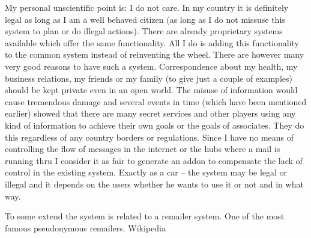 My personal unscientific point is: I do not care. In my country it is definitely legal as long as I am a well behaved citizen (as long as I do not missuse this system to plan or do illegal actions). There are already proprietary systems available which offer the same functionality. All I do is adding this functionality to the common system instead of reinventing the wheel. There are however many very good reasons to have such a system. Correspondence about my health, my business relations, my friends or my family (to give just a couple of examples) should be kept private even in an open world. The misuse of information would cause tremendous damage and several events in time (which have been mentioned earlier) showed that there are many secret services and other players using any kind of information to achieve their own goals or the goals of associates. They do this regardless of any country borders or regulations. Since I have no means of controlling the flow of messages in the internet or the hubs where a mail is running thru I consider it as fair to generate an addon to compensate the lack of control in the existing system. Exactly as a car -- the system may be legal or illegal and it depends on the users whether he wants to use it or not and in what way.\par

To some extend the system is related to a remailer system. One of the most famous pseudonymous remailers. Wikipedia 

